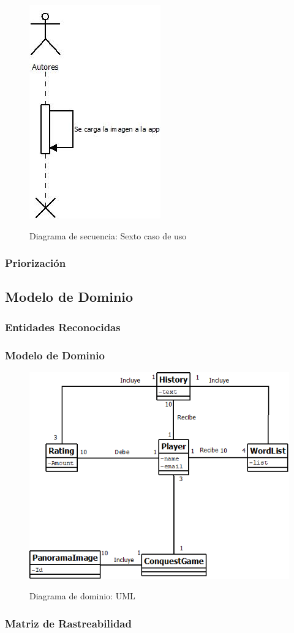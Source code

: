 \begin{figure}[htbp]
\centering
   \includegraphics[scale=0.9]{imgs/DS_6.jpeg}
   \begin{center}
   Diagrama de secuencia: Sexto caso de uso
   \end{center}
\end{figure}
\subsubsection{Priorización}

\subsection{Modelo de Dominio}
\subsubsection{Entidades Reconocidas}
\subsubsection{Modelo de Dominio}
\begin{figure}[htbp]
\centering
   \includegraphics[scale=0.5]{imgs/ModeloDominio.png}
   \begin{center}
   Diagrama de dominio: UML
   \end{center}
\end{figure}
\subsubsection{Matriz de Rastreabilidad}